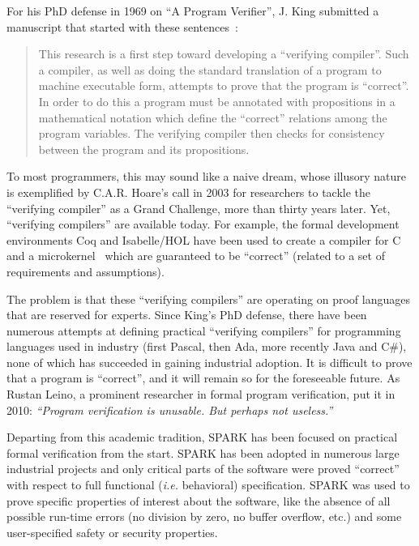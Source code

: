 \documentclass{eceasst}
\newcommand{\ie}{\textit{i.e.}\xspace}
\begin{document}
For his PhD defense in 1969 on ``A Program Verifier'', J. King submitted a
manuscript that started with these sentences~\cite{King1970PhD}:

\begin{quote}
This research is a first step toward developing a ``verifying compiler''. Such
a compiler, as well as doing the standard translation of a program to machine
executable form, attempts to prove that the program is ``correct''. In order to
do this a program must be annotated with propositions in a mathematical
notation which define the ``correct'' relations among the program
variables. The verifying compiler then checks for consistency between the
program and its propositions.
\end{quote}

To most programmers, this may sound like a naive dream, whose illusory nature
is exemplified by C.A.R. Hoare’s call in 2003 for researchers to tackle the
``verifying compiler'' as a Grand Challenge, more than thirty years later. Yet,
``verifying compilers'' are available today. For example, the formal
development environments Coq and Isabelle/HOL have been used to create a
compiler for C~\cite{Leroy-backend} and a microkernel~\cite{Klein2009SOSP}
which are guaranteed to be ``correct'' (related to a set of requirements and
assumptions).

The problem is that these ``verifying compilers'' are operating on proof
languages that are reserved for experts. Since King's PhD defense, there have
been numerous attempts at defining practical ``verifying compilers'' for
programming languages used in industry (first Pascal, then Ada, more recently
Java and C\#), none of which has succeeded in gaining industrial adoption. It
is difficult to prove that a program is ``correct'', and it will remain so for
the foreseeable future. As Rustan Leino, a prominent researcher in formal
program verification, put it in 2010: \textit{``Program verification is
  unusable. But perhaps not useless.''}~\cite{Leino10usableauto-active}

Departing from this academic tradition, SPARK has been focused on practical
formal verification from the start. SPARK has been adopted in numerous large
industrial projects and only critical parts of the software were proved
``correct'' with respect to full functional (\ie behavioral) specification. SPARK was used to
prove specific properties of interest about the software, like the absence of
all possible run-time errors (no division by zero, no buffer overflow, etc.) and
some user-specified safety or security properties.
\end{document}
